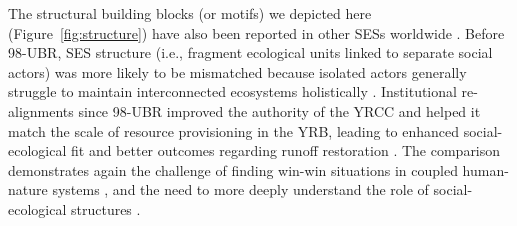 The structural building blocks (or motifs) we depicted here (Figure~\ref{fig:structure}) have also been reported in other SESs worldwide \cite{kluger2020,guerrero2015,bodin2012}.
Before 98-UBR, SES structure (i.e., fragment ecological units linked to separate social actors) was more likely to be mismatched because isolated actors generally struggle to maintain interconnected ecosystems holistically \cite{sayles2017,sayles2019,cai2016,bergsten2019}.
Institutional re-alignments since 98-UBR improved the authority of the YRCC and helped it match the scale of resource provisioning in the YRB, leading to enhanced social-ecological fit and better outcomes regarding runoff restoration \cite{cumming2020a,wang2019d}.
The comparison demonstrates again the challenge of finding win-win situations in coupled human-nature systems \cite{hegwood2022}, and the need to more deeply understand the role of social-ecological structures \cite{bergsten2019, sayles2019}.



